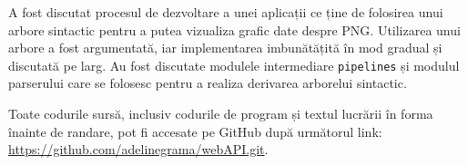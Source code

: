 \documentclass[a4paper,12pt]{report}
\renewcommand{\year}{2025}
\newcommand{\conferencesList}{Conferința Studențească, Editia XXVIII-a, \year}
\newcommand{\github}{\url{https://github.com/adelinegrama/webAPI.git}}
\begin{document}
A fost discutat procesul de dezvoltare a unei aplicații ce ține de folosirea unui arbore sintactic
pentru a putea vizualiza grafic date despre \ac{PNG}.
Utilizarea unui arbore a fost argumentată, iar implementarea imbunătățită în mod gradual și discutată pe larg.
Au fost discutate modulele intermediare \texttt{pipelines} și modulul parserului care
se folosesc pentru a realiza derivarea arborelui sintactic.

Toate codurile sursă, inclusiv codurile de program și textul lucrării
în forma înainte de randare, pot fi accesate pe GitHub după următorul link: \github.


\newpage
{}















\end{document}

